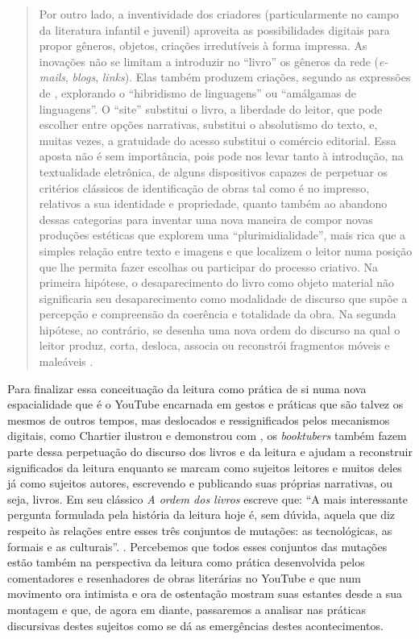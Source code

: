 \begin{quote}
Por outro lado, a inventividade dos criadores (particularmente no campo
da literatura infantil e juvenil) aproveita as possibilidades digitais
para propor gêneros, objetos, criações irredutíveis à forma impressa. As
inovações não se limitam a introduzir no \enquote{livro} os gêneros da rede
(\textit{e-mails}, \textit{blogs}, \textit{links}). Elas também produzem criações, segundo as
expressões de \textcite{lajolo_literatura_2017}, explorando o
\enquote{hibridismo de linguagens} ou \enquote{amálgamas de linguagens}. O \enquote{site} substitui o livro, a liberdade do leitor, que pode escolher entre opções narrativas, substitui o absolutismo do texto, e, muitas vezes, a
gratuidade do acesso substitui o comércio editorial. Essa aposta não é
sem importância, pois pode nos levar tanto à introdução, na textualidade
eletrônica, de alguns dispositivos capazes de perpetuar os critérios
clássicos de identificação de obras tal como é no impresso, relativos a
sua identidade e propriedade, quanto também ao abandono dessas
categorias para inventar uma nova maneira de compor novas produções
estéticas que explorem uma \enquote{plurimidialidade}, mais rica que a simples
relação entre texto e imagens e que localizem o leitor numa posição que
lhe permita fazer escolhas ou participar do processo criativo. Na
primeira hipótese, o desaparecimento do livro como objeto material não
significaria seu desaparecimento como modalidade de discurso que supõe a
percepção e compreensão da coerência e totalidade da obra. Na segunda
hipótese, ao contrário, se desenha uma nova ordem do discurso na qual o
leitor produz, corta, desloca, associa ou reconstrói fragmentos móveis e
maleáveis \cite[p. 14–15]{chartier2019lersem}.
\end{quote}

Para finalizar essa conceituação da leitura como prática de si numa nova
espacialidade que é o YouTube encarnada em gestos e práticas que são
talvez os mesmos de outros tempos, mas deslocados e ressignificados
pelos mecanismos digitais, como Chartier ilustrou e demonstrou com
\textcite{lajolo_literatura_2017}, os \textit{booktubers} também fazem parte dessa perpetuação do discurso dos livros e da leitura e ajudam a reconstruir
significados da leitura enquanto se marcam como sujeitos leitores e
muitos deles já como sujeitos autores, escrevendo e publicando suas
próprias narrativas, ou seja, livros. Em seu clássico \textit{A ordem dos
livros} \textcite{chartier1999ordem} escreve que: \enquote{A mais interessante pergunta formulada pela história da leitura hoje é, sem dúvida, aquela que diz respeito às relações entre esses três conjuntos de mutações: as tecnológicas, as
formais e as culturais}. \cite[p. 24]{chartier1999ordem}. Percebemos que todos
esses conjuntos das mutações estão também na perspectiva da leitura como
prática desenvolvida pelos comentadores e resenhadores de obras
literárias no YouTube e que num movimento ora intimista e ora de
ostentação mostram suas estantes desde a sua montagem e que, de agora em
diante, passaremos a analisar nas práticas discursivas destes sujeitos
como se dá as emergências destes acontecimentos.

